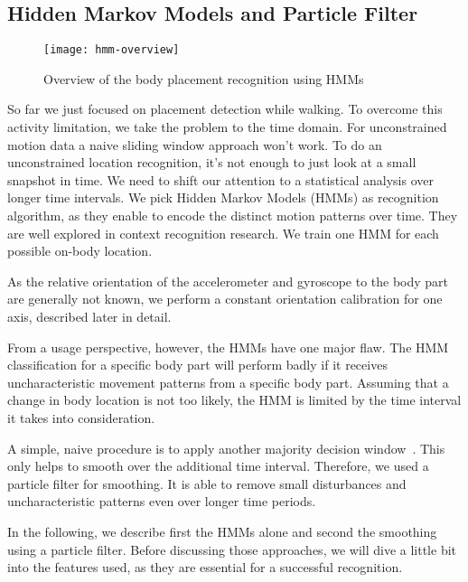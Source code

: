 \subsection{Hidden Markov Models and Particle Filter}
\begin{figure}[!t]
\centering
\texttt{[image: hmm-overview]}
\caption{Overview of the body placement recognition using HMMs}  
\label{fig:hmm-overview} 
\end{figure}

So far we just focused on placement detection while walking.
To overcome this activity limitation, we take the problem to the time
domain. For unconstrained motion data a naive sliding window approach won't work.
To do an unconstrained location recognition, it's
not enough to just look at a small snapshot in time. We need to shift our
attention to a statistical analysis over longer time intervals. 
We pick Hidden Markov Models (HMMs) as recognition algorithm, as they enable to 
encode the distinct motion patterns over time. They are  well explored in context
recognition research.  We train one HMM for each possible on-body
location. 

As the relative orientation of the accelerometer and gyroscope to the
body part are generally not known, we perform a constant orientation
calibration for one axis, described later in detail.

From a usage perspective, however, the HMMs have one major flaw. The HMM
classification for a specific body part will perform badly if it
receives uncharacteristic movement patterns from a specific body part.
Assuming that a change in body location is not too likely, the HMM is
limited by the time interval it takes into consideration.

A simple, naive procedure is to apply another majority decision
window~\cite{Kunze:2007p86}. This only helps to smooth over the
additional time interval. Therefore, we used a
particle filter for smoothing. It is able to remove small
disturbances and uncharacteristic patterns even over longer time periods.

In the following, we describe first the HMMs alone and second the
smoothing using a particle filter. Before discussing those
approaches, we will dive a little bit into the features used, as they
are essential for a successful recognition.


